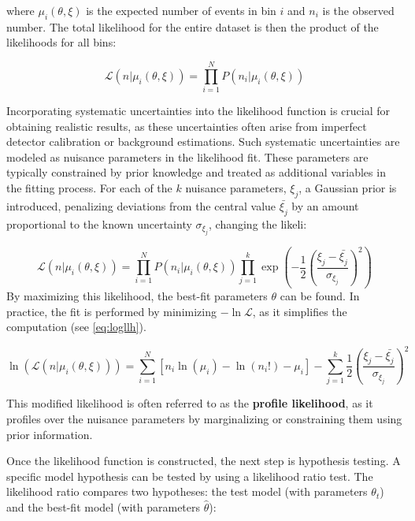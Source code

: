 where $\mu_i(\theta,\xi)$ is the expected number of events in bin $i$ and $n_i$ is the observed number. The total likelihood for the entire dataset is then the product of the likelihoods for all bins:

\begin{equation}\label{eq:llh_noprior}
    \mathcal{L}(n|\mu_i(\theta,\xi)) = \prod_{i=1}^{N} P(n_i|\mu_i(\theta,\xi))
\end{equation}

Incorporating systematic uncertainties into the likelihood function is crucial for obtaining realistic results, as these uncertainties often arise from imperfect detector calibration or background estimations. Such systematic uncertainties are modeled as nuisance parameters in the likelihood fit. These parameters are typically constrained by prior knowledge and treated as additional variables in the fitting process. For each of the $k$ nuisance parameters, $\xi_j$, a Gaussian prior is introduced, penalizing deviations from the central value $\bar{\xi_j}$ by an amount proportional to the known uncertainty $\sigma_{\xi_j}$, changing the likeli:

\begin{equation}\label{eq:llh_withprior}
    \mathcal{L}(n|\mu_i(\theta,\xi)) = \prod_{i=1}^{N} P(n_i|\mu_i(\theta,\xi)) \prod_{j=1}^{k} \exp\left(-\frac{1}{2}\left(\frac{\xi_j - \bar{\xi_j}}{\sigma_{\xi_j}}\right)^2\right)
\end{equation}
By maximizing this likelihood, the best-fit parameters $\theta$ can be found. In practice, the fit is performed by minimizing $-\ln\mathcal{L}$, as it simplifies the computation (see \ref{eq:logllh}). 

\begin{equation}\label{eq:logllh}
    \ln(\mathcal{L}(n|\mu_i(\theta,\xi))) = \sum_{i=1}^{N} \left[ n_i \ln(\mu_i) - \ln(n_i!) - \mu_i \right] 
    - \sum_{j=1}^{k} \frac{1}{2} \left( \frac{\xi_j - \bar{\xi_j}}{\sigma_{\xi_j}} \right)^2
\end{equation}

This modified likelihood is often referred to as the \textbf{profile likelihood}, as it profiles over the nuisance parameters by marginalizing or constraining them using prior information.

Once the likelihood function is constructed, the next step is hypothesis testing. A specific model hypothesis can be tested by using a likelihood ratio test. The likelihood ratio compares two hypotheses: the test model (with parameters $\theta_t$) and the best-fit model (with parameters $\hat{\theta}$):

